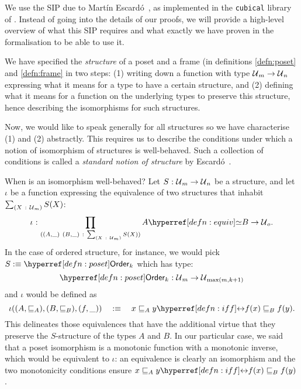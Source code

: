 We use the SIP due to Martín Escardó~\cite{escardo-uf-intro}, as implemented in the
\texttt{cubical} library~\cite{agda-cubical} of \veragda{}. Instead of going into the
details of our proofs, we will provide a high-level overview of what this SIP requires and
what exactly we have proven in the \veragda{} formalisation to be able to use it.

We have specified the \emph{structure} of a poset and a frame (in definitions
\ref{defn:poset} and \ref{defn:frame} in two steps: (1) writing down a function with type
$\mathcal{U}{}_m \rightarrow \mathcal{U}{}_n$ expressing what it means for a type to have a certain structure,
and (2) defining what it means for a function on the underlying types to preserve this
structure, hence describing the isomorphisms for such structures.

Now, we would like to speak generally for all structures so we have characterise (1) and
(2) abstractly. This requires us to describe the conditions under which a notion of
isomorphism of structures is well-behaved. Such a collection of conditions is called
a \emph{standard notion of structure} by Escard\'{o}~\cite{escardo-uf-intro}.

When is an isomorphism well-behaved? Let $S\hspace{0.1mm}:\hspace{0.1mm}\mathcal{U}{}_m \rightarrow \mathcal{U}{}_n$ be a structure,
and let $\iota$ be a function expressing the equivalence of two structures that inhabit
$\sum_{(X~:~\mathcal{U}{}_m)} S(X)$:
\begin{equation*}
  \oftyI{\iota}{%
    \pity{(A , \_)~(B , \_)}{\sigmaty{X}{\univ{}_m}{S(X)}}{%
      \typequiv{A}{B} \rightarrow \univ{}_o.
    }
  }
\end{equation*}
In the case of ordered structure, for instance, we would pick $S \is \ordernm{}_k$ which
has type:
\begin{equation*}
  \oftyI{\ordernm{}_k}{\univ{}_m \rightarrow \univ{}_{\max(m, k+1)}}
\end{equation*}
and $\iota$ would be defined as
\begin{equation*}
  \iota((A, \sqsubseteq_A), (B, \sqsubseteq_B), (f , \_)) \quad\is\quad \logequiv{x \sqsubseteq_A y}{f(x) \sqsubseteq_B f(y)}.
\end{equation*}
This delineates those equivalences that have the additional virtue that they preserve the
$S$-structure of the types $A$ and $B$. In our particular case, we said that a poset
isomorphism is a monotonic function with a monotonic inverse, which would be equivalent to
$\iota$: an equivalence is clearly an isomorphism and the two monotonicity conditions ensure
$\logequiv{x \sqsubseteq_A y}{f(x) \sqsubseteq_B f(y)}$.

